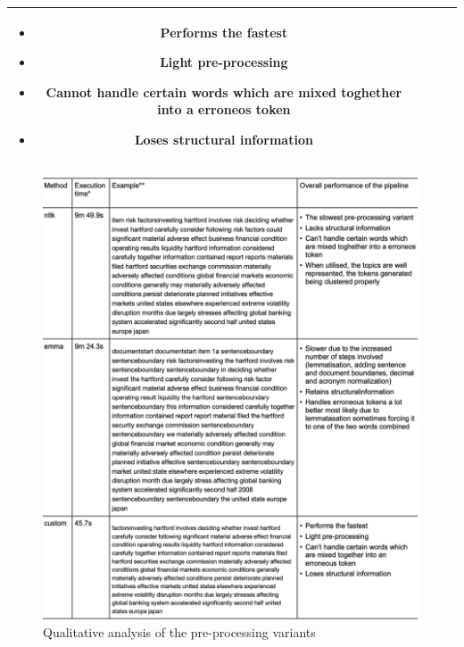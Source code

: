 \documentclass[12pt,MSc,a4paper,oneside]{muthesis}
\begin{document}
\begin{table}
\begin{tabularx}{\textwidth}{|c|c|X|c|}
    \begin{itemize}
            \item Performs the fastest
            \item Light pre-processing
            \item Cannot handle certain words which are mixed toghether into a erroneos token
            \item Loses structural information
    \end{itemize}\\
  \bottomrule
  
\end{tabularx}
\end{table}

\begin{figure}[h]
    \includegraphics[scale=0.52]{images/pre-processing-variantas.png}
    \caption{Qualitative analysis of the pre-processing variants}
\end{figure}
\end{document}
